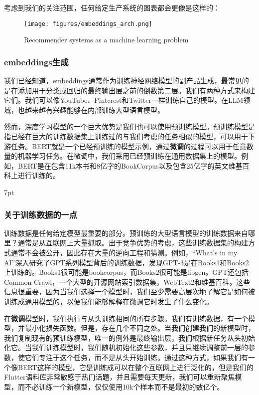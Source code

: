 \documentclass[Chinese, 11pt, table]{diazessay} %
\newenvironment{formal}{%
  \def\FrameCommand{%
	\hspace{1pt}%
	{\color{w_lightblue}\vrule width 2pt}%
	{\color{formalshade}\vrule width 4pt}%
	\colorbox{formalshade}%
  }%
  \MakeFramed{\advance\hsize-\width\FrameRestore}%
  \noindent\hspace{-4.55pt}%
  \begin{adjustwidth}{}{7pt}%
  \vspace{2pt}\vspace{2pt}%
}
{%
  \vspace{2pt}\end{adjustwidth}\endMakeFramed%
}
\begin{document}
\begin{CJK}{UTF8}{gbsn}
\begin{sloppypar}
考虑到我们的关注范围，任何给定生产系统的图表都会更像是这样的：

\begin{figure}[H]
\centering
\texttt{[image: figures/embeddings\_arch.png]}
\caption{Recommender systems as a machine learning problem}
\end{figure}


\subsubsection{embeddings生成}

我们已经知道，embeddings通常作为训练神经网络模型的副产品生成，最常见的是在添加用于分类或回归的最终输出层之前的倒数第二层。我们有两种方式来构建它们。我们可以像YouTube、Pinterest和Twitter一样训练自己的模型。在LLM领域，也越来越有兴趣能够在内部训练大型语言模型。

然而，深度学习模型的一个巨大优势是我们也可以使用预训练模型。预训练模型是指已经在巨大的训练数据集上训练过的与我们考虑的任务相似的模型，可以用于下游任务。BERT就是一个已经预训练的模型示例，通过\textbf{微调}的过程可以用于任意数量的机器学习任务。在微调中，我们采用已经预训练在通用数据集上的模型。例如，BERT是在包含11k本书和8亿字的BookCorpus以及包含25亿字的英文维基百科上进行训练的。

\begin{formal}
\subsubsection*{关于训练数据的一点}
训练数据是任何给定模型最重要的部分。预训练的大型语言模型的训练数据来自哪里？通常是从互联网上大量抓取。出于竞争优势的考虑，这些训练数据集的构建方式通常不会被公开，因此存在大量的逆向工程和猜测。例如，“What's in my AI”深入研究了GPT系列模型背后的训练数据，发现GPT-3是在Books1和Books2上训练的。Books1很可能是bookcorpus，而Books2很可能是libgen。GPT还包括Common Crawl，一个大型的开源网站索引数据集，WebText2和维基百科。这些信息很重要，因为当我们选择一个模型时，我们至少需要高层次地了解它是如何被训练成通用模型的，以便我们能够解释在微调它时发生了什么变化。
\end{formal}

在\textbf{微调}模型时，我们执行与从头训练相同的所有步骤。我们有训练数据，有一个模型，并最小化损失函数。但是，存在几个不同之处。当我们创建我们的新模型时，我们复制现有的预训练模型，唯一的例外是最终输出层，我们根据新任务从头初始化它。当我们训练模型时，我们随机初始化这些参数，并且只继续调整前一层的参数，使它们专注于这个任务，而不是从头开始训练。通过这种方式，如果我们有一个像BERT这样的模型，它是训练成可以在整个互联网上进行泛化的，但是我们的Flutter语料库非常敏感于热门话题，并且需要每天更新，我们可以重新聚焦模型，而不必训练一个新模型，仅仅使用10k个样本而不是最初的数亿个。


\end{sloppypar}
\end{CJK}
\end{document}
